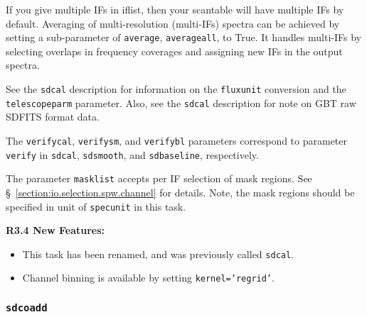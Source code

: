 If you give multiple IFs in iflist, then your scantable will have
multiple IFs by default. Averaging of multi-resolution (multi-IFs)
spectra can be achieved by setting a sub-parameter of {\tt average}, 
{\tt averageall}, to True. It handles multi-IFs by selecting overlaps in 
frequency coverages and assigning new IFs in the output spectra.

See the {\tt sdcal} description for information on the {\tt fluxunit} 
conversion and the {\tt telescopeparm} parameter.
Also, see the {\tt sdcal} description for note on GBT raw SDFITS format data.

The {\tt verifycal}, {\tt verifysm}, and {\tt verifybl}  parameters correspond to parameter
{\tt  verify} in {\tt sdcal}, {\tt sdsmooth}, and {\tt sdbaseline}, respectively. 
    

The parameter {\tt masklist} accepts per IF selection of mask regions. 
See \S~\ref{section:io.selection.spw.channel} for details. 
Note, the mask regions should be specified in unit of {\tt specunit} 
in this task.

\medskip
{\bf R3.4 New Features:}
\begin{itemize}
\item This task has been renamed, and was previously called {\tt sdcal}.
\item Channel binning is available by setting {\tt kernel='regrid'}.
\end{itemize}

\subsubsection{{\tt sdcoadd}}
\label{section:sd.sdtasks.tasks.sdcoadd}


